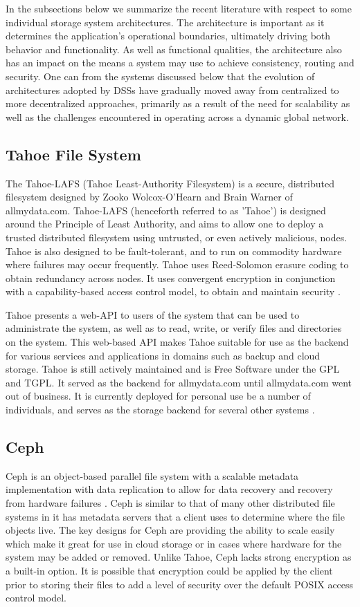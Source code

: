\documentclass[11pt]{article}
\begin{document}
In the subsections below we summarize the recent literature with
respect to some individual storage system architectures. The
architecture is important as it determines the application’s
operational boundaries, ultimately driving both behavior and
functionality. As well as functional qualities, the architecture also
has an impact on the means a system may use to achieve consistency,
routing and security. One can from the systems discussed below that
the evolution of architectures adopted by DSSs have gradually moved
away from centralized to more decentralized approaches, primarily as a
result of the need for scalability as well as the challenges
encountered in operating across a dynamic global network.

\subsection{Tahoe File System}
The Tahoe-LAFS (Tahoe Least-Authority Filesystem) is a secure,
distributed filesystem designed by Zooko Wolcox-O'Hearn and Brain
Warner of allmydata.com. Tahoe-LAFS (henceforth referred to as
'Tahoe') is designed around the Principle of Least Authority, and aims
to allow one to deploy a trusted distributed filesystem using
untrusted, or even actively malicious, nodes. Tahoe is also designed
to be fault-tolerant, and to run on commodity hardware where failures
may occur frequently. Tahoe uses Reed-Solomon erasure coding to obtain
redundancy across nodes. It uses convergent encryption in conjunction
with a capability-based access control model, to obtain and maintain
security \cite{WilcoxOHearn:2008}.

Tahoe presents a web-API to users of the system that can be used to
administrate the system, as well as to read, write, or verify files
and directories on the system. This web-based API makes Tahoe suitable
for use as the backend for various services and applications in
domains such as backup and cloud storage. Tahoe is still actively
maintained and is Free Software under the GPL and TGPL. It served as
the backend for allmydata.com until allmydata.com went out of
business. It is currently deployed for personal use be a number of
individuals, and serves as the storage backend for several other
systems \cite{tahoe-lafs.org}.

\subsection{Ceph}
Ceph is an object-based parallel file system with a scalable metadata
implementation with data replication to allow for data recovery and
recovery from hardware failures
\cite{Weil:2007,Maltzahn:2010,Weil:2006}.
Ceph is similar to that of many other distributed file systems in it 
has metadata servers that a client uses to determine where the file 
objects live. The key designs for Ceph are providing the ability to 
scale easily which make it great for use in cloud storage or in cases 
where hardware for the system may be added or removed. Unlike Tahoe, 
Ceph lacks strong encryption as a built-in option. It is possible that 
encryption could be applied by the client prior to storing their files 
to add a level of security over the default POSIX access control model.
\end{document}
